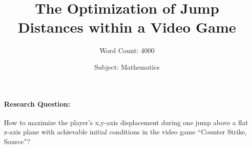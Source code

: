 \documentclass[a4paper,12pt]{article}
\title{The Optimization of Jump Distances within a Video Game}
\author{Word Count: 4000}
\date{Subject: Mathematics}
\numberwithin{equation}{section}
\begin{document}
    \maketitle

    \paragraph{Research Question:} How to maximize the player's x,y-axis displacement during one jump above a flat z-axis plane with achievable initial conditions in the video game ``Counter Strike, Source''?

    \newpage

    \newpage

    \tableofcontents

    \newpage



























%
%



\newpage
{}
\printbibliography


%
\end{document}
